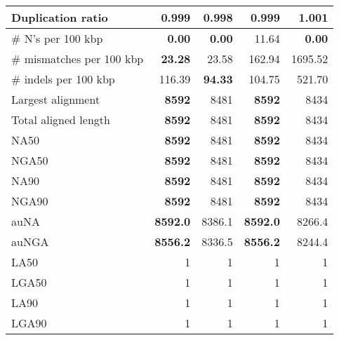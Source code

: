 \documentclass[12pt,a4paper]{article}
\begin{document}
\begin{table}[ht]
\begin{center}
\begin{tabular}{|l*{4}{|r}|}
Duplication ratio & 0.999 & {\bf 0.998} & 0.999 & 1.001 \\ \hline
\# N's per 100 kbp & {\bf 0.00} & {\bf 0.00} & 11.64 & {\bf 0.00} \\ \hline
\# mismatches per 100 kbp & {\bf 23.28} & 23.58 & 162.94 & 1695.52 \\ \hline
\# indels per 100 kbp & 116.39 & {\bf 94.33} & 104.75 & 521.70 \\ \hline
Largest alignment & {\bf 8592} & 8481 & {\bf 8592} & 8434 \\ \hline
Total aligned length & {\bf 8592} & 8481 & {\bf 8592} & 8434 \\ \hline
NA50 & {\bf 8592} & 8481 & {\bf 8592} & 8434 \\ \hline
NGA50 & {\bf 8592} & 8481 & {\bf 8592} & 8434 \\ \hline
NA90 & {\bf 8592} & 8481 & {\bf 8592} & 8434 \\ \hline
NGA90 & {\bf 8592} & 8481 & {\bf 8592} & 8434 \\ \hline
auNA & {\bf 8592.0} & 8386.1 & {\bf 8592.0} & 8266.4 \\ \hline
auNGA & {\bf 8556.2} & 8336.5 & {\bf 8556.2} & 8244.4 \\ \hline
LA50 & 1 & 1 & 1 & 1 \\ \hline
LGA50 & 1 & 1 & 1 & 1 \\ \hline
LA90 & 1 & 1 & 1 & 1 \\ \hline
LGA90 & 1 & 1 & 1 & 1 \\ \hline
\end{tabular}
\end{center}
\end{table}
\end{document}
